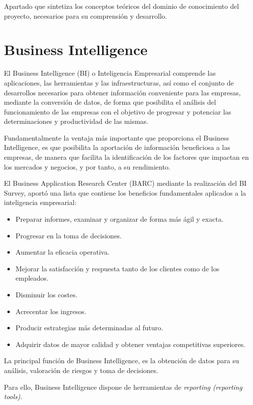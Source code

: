 
Apartado que sintetiza los conceptos teóricos del dominio de conocimiento del proyecto, necesarios para su comprensión y desarrollo.

\section{Business Intelligence}
El Business Intelligence (BI) o Inteligencia Empresarial \cite{BI} comprende las aplicaciones, las herramientas y las infraestructuras, así como el conjunto de desarrollos necesarios para obtener información conveniente para las empresas, mediante la conversión de datos, de forma que posibilita el análisis del funcionamiento de las empresas con el objetivo de progresar y potenciar las determinaciones y productividad de las mismas.

Fundamentalmente la ventaja más importante que proporciona el Business Intelligence, es que posibilita la aportación de información beneficiosa a las empresas, de manera que facilita la identificación de los factores que impactan en los mercados y negocios, y por tanto, a su rendimiento.

El Business Application Research Center (BARC) mediante la realización del BI Survey, aportó una lista que contiene los beneficios fundamentales aplicados a la inteligencia empresarial:
\begin{itemize}
    \item Preparar informes, examinar y organizar de forma más ágil y exacta.
    \item Progresar en la toma de decisiones.
    \item Aumentar la eficacia operativa.
    \item Mejorar la satisfacción y respuesta tanto de los clientes como de los empleados.
    \item Disminuir los costes.
    \item Acrecentar los ingresos.
    \item Producir estrategias más determinadas al futuro.
    \item Adquirir datos de mayor calidad y obtener ventajas competitivas superiores.
\end{itemize}

La principal función de Business Intelligence, es la obtención de datos para su análisis, valoración de riesgos y toma de decisiones.

Para ello, Business Intelligence dispone de herramientas de \emph{reporting (reporting tools)}.


